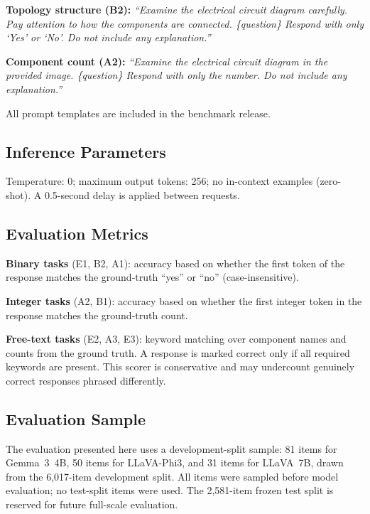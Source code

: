 \documentclass[conference]{IEEEtran}
\begin{document}
\textbf{Topology structure (B2):}
\textit{``Examine the electrical circuit diagram carefully.
Pay attention to how the components are connected.
\{question\}
Respond with only `Yes' or `No'. Do not include any explanation.''}

\textbf{Component count (A2):}
\textit{``Examine the electrical circuit diagram in the provided image.
\{question\}
Respond with only the number. Do not include any explanation.''}

All prompt templates are included in the benchmark release.

\subsection{Inference Parameters}

Temperature: 0; maximum output tokens: 256; no in-context examples
(zero-shot).
A 0.5-second delay is applied between requests.

\subsection{Evaluation Metrics}

\textbf{Binary tasks} (E1, B2, A1): accuracy based on whether the
first token of the response matches the ground-truth ``yes'' or ``no''
(case-insensitive).

\textbf{Integer tasks} (A2, B1): accuracy based on whether the first
integer token in the response matches the ground-truth count.

\textbf{Free-text tasks} (E2, A3, E3): keyword matching over component
names and counts from the ground truth.
A response is marked correct only if all required keywords are present.
This scorer is conservative and may undercount genuinely correct
responses phrased differently.

\subsection{Evaluation Sample}

The evaluation presented here uses a development-split sample:
81 items for Gemma~3~4B, 50 items for LLaVA-Phi3, and 31 items for
LLaVA~7B, drawn from the 6,017-item development split.
All items were sampled before model evaluation; no test-split items
were used.
The 2,581-item frozen test split is reserved for future full-scale
evaluation.


\end{document}
